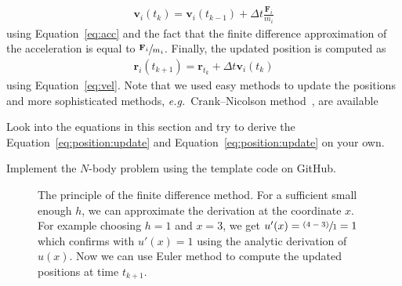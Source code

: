 \begin{align}
\mathbf{v}_i(t_k) = \mathbf{v}_i(t_{k-1}) + \Delta t \frac{\mathbf{F}_i}{m_i} \label{eq:position:update}
\end{align}
using Equation~\eqref{eq:acc} and the fact that the finite difference approximation of the acceleration is equal to $\sfrac{\mathbf{F}_i}{m_i}$. Finally, the updated position is computed as
\begin{align}
\mathbf{r}_i(t_{k+1}) = \mathbf{r}_{t_k} + \Delta t \mathbf{v}_i(t_k)  \label{eq:position:update}
\end{align} 
using Equation~\eqref{eq:vel}. Note that we used easy methods to update the positions and more sophisticated methods, \emph{e.g.}\ Crank--Nicolson method~\cite{crank1947practical}, are available

\begin{exercise}
Look into the equations in this section and try to derive the Equation~\ref{eq:position:update} and Equation~\ref{eq:position:update} on your own.
\end{exercise}

\begin{exercise}
Implement the $N$-body problem using the template code on GitHub.
\end{exercise}

\begin{figure}[tb]
\centering
{}
\caption{The principle of the finite difference method. For a sufficient small enough $h$, we can approximate the derivation at the coordinate $x$. For example choosing $h=1$ and $x=3$, we get $u'(x)=\sfrac{(4-3)}{1}=1$ which confirms with $u'(x)=1$ using the analytic derivation of $u(x)$. Now we can use Euler method to compute the updated positions at time $t_{k+1}$.}
\label{fig:nbody:finitedifference}
\end{figure}

